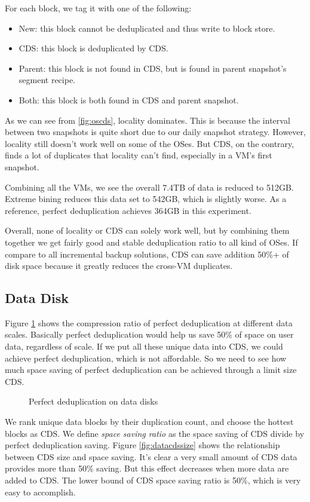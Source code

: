 For each block, we tag it with one of the following:
\begin{itemize}
\item {New: this block cannot be deduplicated and thus write to block store.}
\item {CDS: this block is deduplicated by CDS.}
\item {Parent: this block is not found in CDS, but is found in parent snapshot's segment recipe.}
\item {Both: this block is both found in CDS and parent snapshot.}
\end{itemize}
As we can see from \ref{fig:oscds}, locality dominates.
This is because the interval between two snapshots is quite short due to our daily snapshot strategy. 
However, locality still doesn't work well on some of the OSes. But CDS, on the contrary,
finds a lot of duplicates that locality can't find, especially in a VM's first snapshot.

Combining all the VMs, we see the overall 7.4TB of data is reduced to 512GB. Extreme bining 
reduces this data set to 542GB, which is slightly worse. As a reference, perfect deduplication achieves
364GB in this experiment.

Overall, none of locality or CDS can solely work well, but by combining them together 
we get fairly good and stable deduplication ratio to all kind of OSes. If compare to all
incremental backup solutions, CDS can save addition 50\%+ of disk space because it greatly reduces
the cross-VM duplicates.

\subsection{Data Disk}
Figure \ref{fig:pd} shows the compression ratio of perfect deduplication at different data scales. 
Basically perfect deduplication would help us save 50\% of space on user data, 
regardless of scale. If we put all these unique data into CDS, we could achieve perfect deduplication, 
which is not affordable. So we need to see how much space saving of perfect 
deduplication can be achieved through a limit size CDS.
\begin{figure}
  \centering
  \caption{Perfect deduplication on data disks}
  \label{fig:pd}
\end{figure}

We rank unique data blocks by their duplication count, 
and choose the hottest blocks as CDS. 
We define \emph{space saving ratio} as the space saving of CDS divide by 
perfect deduplication saving. Figure \ref{fig:datacdssize} shows the relationship between CDS size and space saving. 
It’s clear a very small amount of CDS data provides more than 50\% saving. 
But this effect decreases when more data are added to CDS. 
The lower bound of CDS space saving ratio is 50\%, which is very easy to accomplish. 


